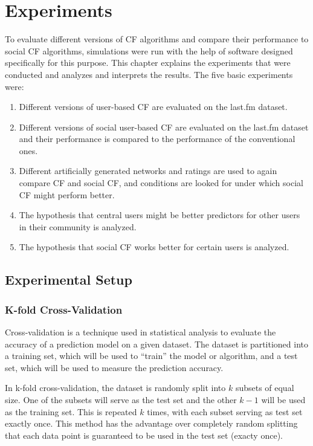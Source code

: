 \chapter{Experiments}
\label{c:experiments} To evaluate different versions of CF algorithms and compare their performance to social CF algorithms, simulations were run with the help of software designed specifically for this purpose. This chapter explains the experiments that were conducted and analyzes and interprets the results. The five basic experiments were:

\begin{enumerate}
\item Different versions of user-based CF are evaluated on the last.fm dataset.
\item Different versions of social user-based CF are evaluated on the last.fm dataset and their performance is compared to the performance of the conventional ones.
\item Different artificially generated networks and ratings are used to again compare CF and social CF, and conditions are looked for under which social CF might perform better.
\item The hypothesis that central users might be better predictors for other users in their community is analyzed.
\item The hypothesis that social CF works better for certain users is analyzed.
\end{enumerate}

\section{Experimental Setup}
\label{st:experimentalsetup}

\subsection{K-fold Cross-Validation}
\label{sst:kfoldcrossvalidation} Cross-validation is a technique used in statistical analysis to evaluate the accuracy of a prediction model on a given dataset. The dataset is partitioned into a training set, which will be used to ``train'' the model or algorithm, and a test set, which will be used to measure the prediction accuracy.

In k-fold cross-validation, the dataset is randomly split into $k$ subsets of equal size. One of the subsets will serve as the test set and the other $k-1$ will be used as the training set. This is repeated $k$ times, with each subset serving as test set exactly once. This method has the advantage over completely random splitting that each data point is guaranteed to be used in the test set (exacty once).

